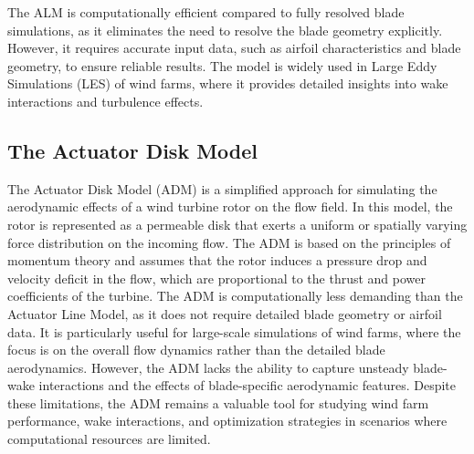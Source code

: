 The ALM is computationally efficient compared to fully resolved blade simulations, as it eliminates the need to resolve the blade geometry explicitly. However, it requires accurate input data, such as airfoil characteristics and blade geometry, to ensure reliable results. The model is widely used in Large Eddy Simulations (LES) of wind farms, where it provides detailed insights into wake interactions and turbulence effects.
\subsection{The Actuator Disk Model} 
The Actuator Disk Model (ADM) is a simplified approach for simulating the aerodynamic effects of a wind turbine rotor on the flow field. In this model, the rotor is represented as a permeable disk that exerts a uniform or spatially varying force distribution on the incoming flow. The ADM is based on the principles of momentum theory and assumes that the rotor induces a pressure drop and velocity deficit in the flow, which are proportional to the thrust and power coefficients of the turbine. The ADM is computationally less demanding than the Actuator Line Model, as it does not require detailed blade geometry or airfoil data. It is particularly useful for large-scale simulations of wind farms, where the focus is on the overall flow dynamics rather than the detailed blade aerodynamics. However, the ADM lacks the ability to capture unsteady blade-wake interactions and the effects of blade-specific aerodynamic features. Despite these limitations, the ADM remains a valuable tool for studying wind farm performance, wake interactions, and optimization strategies in scenarios where computational resources are limited.

